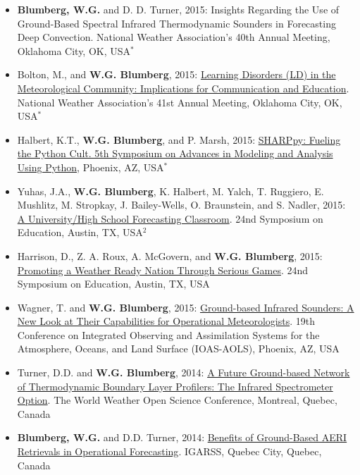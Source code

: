\documentclass[10pt]{res} %
\begin{document}
\begin{resume}
\begin{itemize}
\item \textbf{Blumberg, W.G.} and D. D. Turner, 2015: Insights Regarding the Use of Ground-Based Spectral Infrared Thermodynamic Sounders in Forecasting Deep Convection. National Weather Association's 40th Annual Meeting, Oklahoma City, OK, USA\textbf{$^{*}$}
\item Bolton, M., and \textbf{W.G. Blumberg}, 2015: \href{http://slideplayer.com/slide/9176419/}{Learning Disorders (LD) in the Meteorological Community: Implications for Communication and Education}. National Weather Association's 41st Annual Meeting, Oklahoma City, OK, USA$^{*}$
\item Halbert, K.T., \textbf{W.G. Blumberg}, and P. Marsh, 2015: \href{https://ams.confex.com/ams/95Annual/webprogram/Paper270233.html}{SHARPpy: Fueling the Python Cult. 5th Symposium on Advances in Modeling and Analysis Using Python}, Phoenix, AZ, USA$^{*}$
\item Yuhas, J.A., \textbf{W.G. Blumberg}, K. Halbert, M. Yalch, T. Ruggiero, E. Mushlitz, M. Stropkay, J. Bailey-Wells, O. Braunstein, and S. Nadler, 2015: \href{https://ams.confex.com/ams/95Annual/webprogram/Paper265787.html}{A University/High School Forecasting Classroom}. 24nd Symposium on Education, Austin, TX, USA$^{2}$
\item Harrison, D., Z. A. Roux, A. McGovern, and \textbf{W.G. Blumberg}, 2015: \href{https://ams.confex.com/ams/95Annual/webprogram/Paper259312.html}{Promoting a Weather Ready Nation Through Serious Games}. 24nd Symposium on Education, Austin, TX, USA
\item Wagner, T. and \textbf{W.G. Blumberg}, 2015: \href{https://ams.confex.com/ams/95Annual/webprogram/Paper260639.html}{Ground-based Infrared Sounders: A New Look at Their Capabilities for Operational Meteorologists}. 19th Conference on Integrated Observing and Assimilation Systems for the Atmosphere, Oceans, and Land Surface (IOAS-AOLS), Phoenix, AZ, USA
\item Turner, D.D. and \textbf{W.G. Blumberg}, 2014: \href{https://www.wmo.int/pages/prog/arep/wwrp/new/wwosc/documents/turner_profiling_vision_wwosc.pdf}{A Future Ground-based Network of Thermodynamic Boundary Layer Profilers: The Infrared Spectrometer Option}. The World Weather Open Science Conference, Montreal, Quebec, Canada
\item \textbf{Blumberg, W.G.} and D.D. Turner, 2014: \href{ftp://ftp.legos.obs-mip.fr/pub/tmp3m/IGARSS2014/abstracts/3989.pdf}{Benefits of Ground-Based AERI Retrievals in Operational Forecasting}. IGARSS, Quebec City, Quebec, Canada

\end{itemize}
\end{resume}
\end{document}
